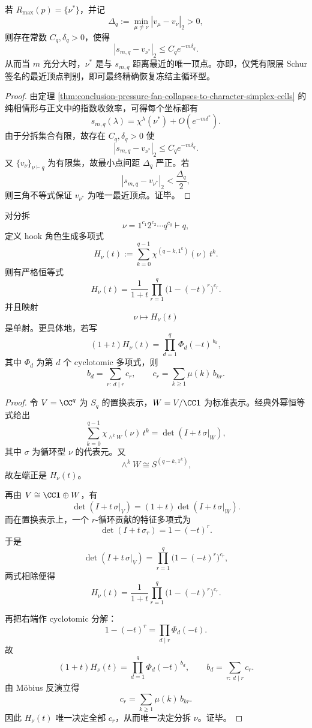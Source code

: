 \begin{corollary}[唯一冻结相的指数可判定性]\label{cor:conclusion-pure-phase-nearest-vertex-exponential-decodability}
若 \(R_{\max}(p)=\{\nu^\ast\}\)，并记
\[
\Delta_q:=\min_{\mu\neq \nu}|v_\mu-v_\nu|_2>0,
\]
则存在常数 \(C_q,\delta_q>0\)，使得
\[
|s_{m,q}-v_{\nu^\ast}|_2\le C_q e^{-m\delta_q}.
\]
从而当 \(m\) 充分大时，\(\nu^\ast\) 是与 \(s_{m,q}\) 距离最近的唯一顶点。亦即，仅凭有限层 Schur 签名的最近顶点判别，即可最终精确恢复冻结主循环型。
\end{corollary}
\begin{proof}
由定理 \ref{thm:conclusion-pressure-fan-collapses-to-character-simplex-cells} 的纯相情形与正文中的指数收敛率，可得每个坐标都有
\[
s_{m,q}(\lambda)=\chi^\lambda(\nu^\ast)+O(e^{-m\delta^\ast}).
\]
由于分拆集合有限，故存在 \(C_q,\delta_q>0\) 使
\[
|s_{m,q}-v_{\nu^\ast}|_2\le C_q e^{-m\delta_q}.
\]
又 \(\{v_\nu\}_{\nu\vdash q}\) 为有限集，故最小点间距 \(\Delta_q\) 严正。若
\[
|s_{m,q}-v_{\nu^\ast}|_2<\frac{\Delta_q}{2},
\]
则三角不等式保证 \(v_{\nu^\ast}\) 为唯一最近顶点。证毕。
\end{proof}

\begin{theorem}\label{thm:conclusion-hook-channel-generating-polynomial-factorization}
对分拆
\[
\nu=1^{c_1}2^{c_2}\cdots q^{c_q}\vdash q,
\]
定义 hook 角色生成多项式
\[
H_\nu(t):=\sum_{k=0}^{q-1}\chi^{(q-k,1^k)}(\nu)\,t^k.
\]
则有严格恒等式
\[
H_\nu(t)=\frac{1}{1+t}\prod_{r=1}^{q}\bigl(1-(-t)^r\bigr)^{c_r}.
\]
并且映射
\[
\nu\longmapsto H_\nu(t)
\]
是单射。更具体地，若写
\[
(1+t)H_\nu(t)=\prod_{d=1}^{q}\Phi_d(-t)^{\,b_d},
\]
其中 \(\Phi_d\) 为第 \(d\) 个 cyclotomic 多项式，则
\[
b_d=\sum_{r:\ d\mid r}c_r,
\qquad
c_r=\sum_{k\ge 1}\mu(k)\,b_{kr}.
\]
\end{theorem}
\begin{proof}
令 \(V=\CC^q\) 为 \(S_q\) 的置换表示，\(W=V/\CC\mathbf 1\) 为标准表示。经典外幂恒等式给出
\[
\sum_{k=0}^{q-1}\chi_{\wedge^k W}(\nu)\,t^k
=
\det(I+t\,\sigma|_W),
\]
其中 \(\sigma\) 为循环型 \(\nu\) 的代表元。又
\[
\wedge^k W\cong S^{(q-k,1^k)},
\]
故左端正是 \(H_\nu(t)\)。

再由 \(V\cong \CC\mathbf 1\oplus W\)，有
\[
\det(I+t\,\sigma|_V)=(1+t)\det(I+t\,\sigma|_W).
\]
而在置换表示上，一个 \(r\)-循环贡献的特征多项式为
\[
\det(I+t\,\sigma_r)=1-(-t)^r.
\]
于是
\[
\det(I+t\,\sigma|_V)=\prod_{r=1}^{q}\bigl(1-(-t)^r\bigr)^{c_r},
\]
两式相除便得
\[
H_\nu(t)=\frac{1}{1+t}\prod_{r=1}^{q}\bigl(1-(-t)^r\bigr)^{c_r}.
\]

再把右端作 cyclotomic 分解：
\[
1-(-t)^r=\prod_{d\mid r}\Phi_d(-t).
\]
故
\[
(1+t)H_\nu(t)=\prod_{d=1}^{q}\Phi_d(-t)^{\,b_d},
\qquad
b_d=\sum_{r:\ d\mid r}c_r.
\]
由 Möbius 反演立得
\[
c_r=\sum_{k\ge 1}\mu(k)\,b_{kr}.
\]
因此 \(H_\nu(t)\) 唯一决定全部 \(c_r\)，从而唯一决定分拆 \(\nu\)。证毕。
\end{proof}

